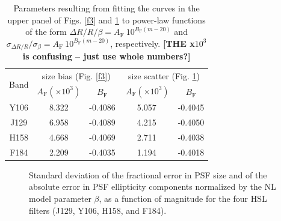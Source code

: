 \documentclass[11pt,preprint,flushrt]{aastex}
\begin{document}
\begin{table}
\centering
\begin{tabular}{|c|c|c|c|c|}
\hline
\multirow{2}{*}{Band} & \multicolumn{2}{c|}{size bias (Fig. \ref{f3})} & \multicolumn{2}{c|}{size scatter (Fig. \ref{f5})} \\
\cline{2-5}
& $A_{\text{F}} (\times 10^3)$ & $B_{\text{F}}$ & $\ A_{\text{F}} (\times 10^3)$ & $B_{\text{F}}$  \\
\hline
Y106 & 8.322 & -0.4086 & 5.057 &  -0.4045  \\
\hline
J129 & 6.958 & -0.4089  & 4.215 &  -0.4050 \\
\hline
H158 & 4.668 & -0.4069 & 2.711 &  -0.4038 \\
\hline
F184 & 2.209 & -0.4035 & 1.194 &  -0.4018 \\
\hline
\end{tabular}
\caption{Parameters resulting from fitting the curves in the upper panel of Figs. \ref{f3} and \ref{f5} to power-law functions of the form $\Delta R/ R/ \beta = A_{\text{F}}\ 10^{B_{\text{F}} (m - 20)}$ and $\sigma_{\Delta R/ R}/ \sigma_{\beta} = A_{\text{F}}\ 10^{B_{\text{F}} (m - 20)}$, respectively. \textbf{[THE x$10^3$ is confusing -- just use whole numbers?]}}
\label{table2}
\end{table}

\begin{figure}[!h]
\centering
{}
\caption{Standard deviation of the fractional error in PSF size and of the absolute error in PSF ellipticity components normalized by the NL model parameter $\beta$, as a function of magnitude for the four HSL filters (J129, Y106, H158, and F184).}
\label{f5}
\end{figure}
\end{document}
